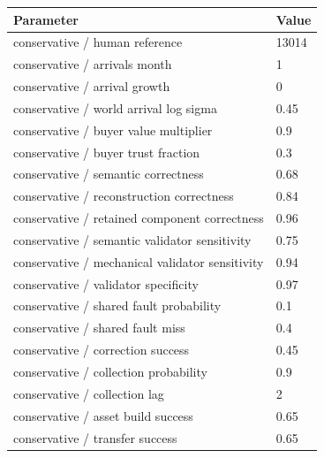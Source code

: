 \documentclass[10pt]{article}
\begin{document}
\begin{longtable}{p{.44\linewidth}p{.50\linewidth}}\toprule Parameter & Value \\\midrule\endhead

conservative / human reference & 13014\\

conservative / arrivals month & 1\\

conservative / arrival growth & 0\\

conservative / world arrival log sigma & 0.45\\

conservative / buyer value multiplier & 0.9\\

conservative / buyer trust fraction & 0.3\\

conservative / semantic correctness & 0.68\\

conservative / reconstruction correctness & 0.84\\

conservative / retained component correctness & 0.96\\

conservative / semantic validator sensitivity & 0.75\\

conservative / mechanical validator sensitivity & 0.94\\

conservative / validator specificity & 0.97\\

conservative / shared fault probability & 0.1\\

conservative / shared fault miss & 0.4\\

conservative / correction success & 0.45\\

conservative / collection probability & 0.9\\

conservative / collection lag & 2\\

conservative / asset build success & 0.65\\

conservative / transfer success & 0.65\\


\end{longtable}
\end{document}
